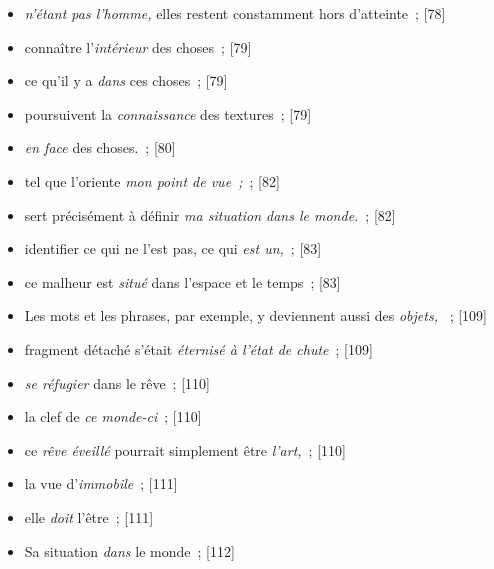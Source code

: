 \documentclass[12pt, a4paper]{article}
\begin{document}
\begin{itemize}
    \item \textit{n’étant pas l’homme,} elles restent constamment hors d’atteinte{\color{gray}~; [78]}

    \item connaître l’\textit{intérieur} des choses{\color{gray}~; [79]}

    \item ce qu’il y a \textit{dans} ces choses{\color{gray}~; [79]}

    \item  poursuivent la \textit{connaissance} des textures{\color{gray}~; [79]}

    \item \textit{en face} des choses.{\color{gray}~; [80]}

    \item tel que l’oriente \textit{mon point de vue~;}{\color{gray}~; [82]}

    \item sert précisément à définir \textit{ma situation dans le monde.}{\color{gray}~; [82]}

    \item identifier ce qui ne l’est pas, ce qui \textit{est un,}{\color{gray}~; [83]}

    \item ce malheur est \textit{situé} dans l’espace et le temps{\color{gray}~; [83]}

    \item Les mots et les phrases, par exemple, y deviennent aussi des \textit{objets, }{\color{gray}~; [109]}

    \item fragment détaché s’était \textit{éternisé à l’état de chute}{\color{gray}~; [109]}

    \item \textit{se réfugier} dans le rêve{\color{gray}~; [110]}

    \item la clef de \textit{ce monde-ci}{\color{gray}~; [110]}

    \item ce \textit{rêve éveillé} pourrait simplement être \textit{l’art,}{\color{gray}~; [110]}

    \item la vue d’\textit{immobile}{\color{gray}~; [111]}

    \item elle \textit{doit} l’être{\color{gray}~; [111]}

    \item Sa situation \textit{dans} le monde{\color{gray}~; [112]}


\end{itemize}
\end{document}
